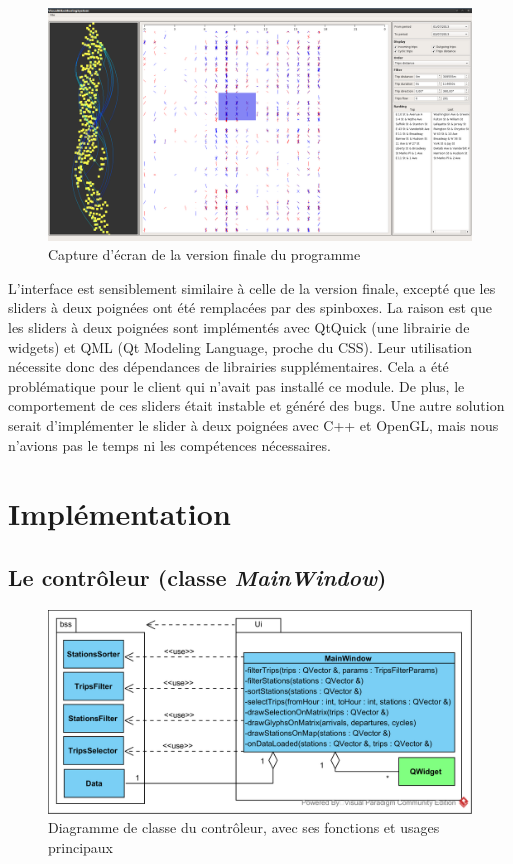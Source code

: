 \documentclass[12pt]{article}
\begin{document}
		\begin{figure}[!h]
		\begin{center}
		\includegraphics[scale=.25]{screen_final_2.png}
		\caption{Capture d’écran de la version finale du programme}
		\end{center}
		\end{figure}
		
		L’interface est sensiblement similaire à celle de la version finale, excepté que les sliders à deux poignées ont été remplacées par des spinboxes. La raison est que les sliders à deux poignées sont implémentés avec QtQuick (une librairie de widgets) et QML (Qt Modeling Language, proche du CSS). Leur utilisation nécessite donc des dépendances de librairies supplémentaires. Cela a été problématique pour le client qui n’avait pas installé ce module. De plus, le comportement de ces sliders était instable et généré des bugs. Une autre solution serait d'implémenter le slider à deux poignées avec C++ et OpenGL, mais nous n’avions pas le temps ni les compétences nécessaires.
		

	\section{Implémentation}
		\subsection{Le contrôleur (classe \textit{MainWindow})}
		\begin{figure}[!h]
		\begin{center}
		\includegraphics[scale=1]{class_diagram_controleur.png}
		\caption{Diagramme de classe du contrôleur, avec ses fonctions et usages principaux}
		\label{fig:dia_controleur}
		\end{center}
		\end{figure}
					
\end{document}
